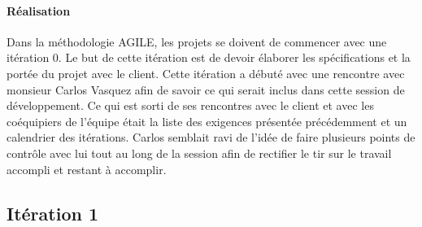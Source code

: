 \documentclass[rapport.tex]{subfiles}
\begin{document}
\paragraph*{Réalisation}
Dans la méthodologie AGILE, les projets se doivent de commencer avec une itération 0. Le but de cette itération est de devoir élaborer les spécifications et la portée du projet avec le client. Cette itération a débuté avec une rencontre avec monsieur Carlos Vasquez afin de savoir ce qui serait inclus dans cette session de développement. Ce qui est sorti de ses rencontres avec le client et avec les coéquipiers de l’équipe était la liste des exigences présentée précédemment et un calendrier des itérations. Carlos semblait ravi de l’idée de faire plusieurs points de contrôle avec lui tout au long de la session afin de rectifier le tir sur le travail accompli et restant à accomplir.
\newpage
\subsection*{Itération 1}
\end{document}
